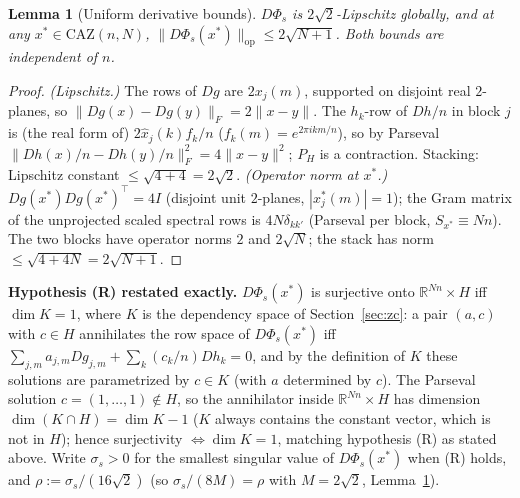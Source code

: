 \documentclass[11pt]{article}
\theoremstyle{plain}
\newtheorem{lemma}[theorem]{Lemma}
\theoremstyle{definition}
\theoremstyle{remark}
\newcommand{\R}{\mathbb R}
\newcommand{\CAZ}{\mathrm{CAZ}}
\begin{document}
\begin{lemma}[Uniform derivative bounds]\label{lem:phis-lip}
$D\Phi_s$ is $2\sqrt2$-Lipschitz globally, and at any $x^*\in\CAZ(n,N)$,
$\|D\Phi_s(x^*)\|_{\mathrm{op}}\le2\sqrt{N+1}$. Both bounds are independent
of $n$.
\end{lemma}
\begin{proof}
\emph{(Lipschitz.)} The rows of $Dg$ are $2x_j(m)$, supported on disjoint
real $2$-planes, so $\|Dg(x)-Dg(y)\|_F=2\|x-y\|$. The $h_k$-row of
$Dh/n$ in block $j$ is (the real form of) $2\hat x_j(k)f_k/n$
($f_k(m)=e^{2\pi ikm/n}$), so by Parseval
$\|Dh(x)/n-Dh(y)/n\|_F^2=4\|x-y\|^2$; $P_H$ is a contraction. Stacking:
Lipschitz constant $\le\sqrt{4+4}=2\sqrt2$.
\emph{(Operator norm at $x^*$.)} $Dg(x^*)Dg(x^*)^\top=4I$ (disjoint unit
$2$-planes, $|x^*_j(m)|=1$); the Gram matrix of the unprojected scaled
spectral rows is $4N\delta_{kk'}$ (Parseval per block, $S_{x^*}\equiv Nn$).
The two blocks have operator norms $2$ and $2\sqrt N$; the stack has norm
$\le\sqrt{4+4N}=2\sqrt{N+1}$.
\end{proof}

\textbf{Hypothesis (R) restated exactly.} $D\Phi_s(x^*)$ is surjective onto
$\R^{Nn}\times H$ iff $\dim K=1$, where $K$ is the dependency space of
Section~\ref{sec:zc}: a pair $(a,c)$ with $c\in H$ annihilates the row
space of $D\Phi_s(x^*)$ iff $\sum_{j,m}a_{j,m}Dg_{j,m}+\sum_k(c_k/n)Dh_k=0$,
and by the definition of $K$ these solutions are parametrized by $c\in K$
(with $a$ determined by $c$). The Parseval solution $c=(1,\dots,1)\notin H$,
so the annihilator inside $\R^{Nn}\times H$ has dimension $\dim(K\cap H)=\dim K-1$
($K$ always contains the constant vector, which is not in $H$); hence
surjectivity $\iff\dim K=1$, matching hypothesis (R) as stated above.
Write $\sigma_s>0$ for the smallest singular value of $D\Phi_s(x^*)$ when
(R) holds, and $\rho:=\sigma_s/(16\sqrt2)$ (so $\sigma_s/(8M)=\rho$ with
$M=2\sqrt2$, Lemma~\ref{lem:phis-lip}).
\end{document}
